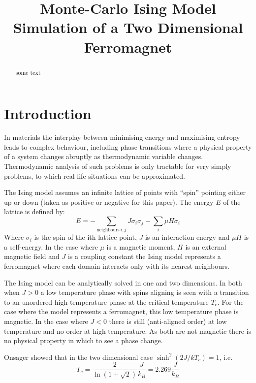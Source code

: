\documentclass[12pt,a4paper,english]{article}
\author{}
\title{Monte-Carlo Ising Model Simulation of a Two Dimensional Ferromagnet}
\begin{document}
\maketitle

\begin{abstract}
some text
\end{abstract}

\section{Introduction}
\label{sec:introduction}
In materials the interplay between minimising energy and maximising entropy leads to complex behaviour, including phase transitions where a physical property of a system changes abruptly as thermodynamic variable changes.  Thermodynamic analysis of such problems is only tractable for very simply problems, to which real life situations can be approximated.

The Ising model\cite{brush67} assumes an infinite lattice of points with ``spin'' pointing either up or down (taken as positive or negative for this paper).  The energy $E$ of the lattice is defined by:
\begin{equation}
\label{eq:ising-energy}
E = - \sum_{\mathrm{neighbours}\: i,j} J \sigma_i \sigma_j - \sum_i \mu H \sigma_i
\end{equation}
Where $\sigma_i$ is the spin of the ith lattice point, $J$ is an interaction energy and $\mu H$ is a self-energy.  In the case where $\mu$ is a magnetic moment, $H$ is an external magnetic field and $J$ is a coupling constant the Ising model represents a ferromagnet where each domain interacts only with its nearest neighbours.

The Ising model can be analytically solved in one and two dimensions.  In both when $J>0$ a low temperature phase with spins aligning is seen with a transition to an unordered high temperature phase at the critical temperature $T_c$.  For the case where the model represents a ferromagnet, this low temperature phase is magnetic.  In the case where $J<0$ there is still (anti-aligned order) at low temperature and no order at high temperature.  As both are not magnetic there is no physical property in which to see a phase change.

Onsager \cite{onsager44} showed that in the two dimensional case $\sinh^2 \left(2J/kT_c\right)=1$, i.e.
\begin{equation}
\label{eq:T-c}
T_c= \frac{2} {\ln \left( 1 + \sqrt{2}\right)} \frac{J}{k_B} = 2.269 \frac{J}{k_B}
\end{equation}
\end{document}
